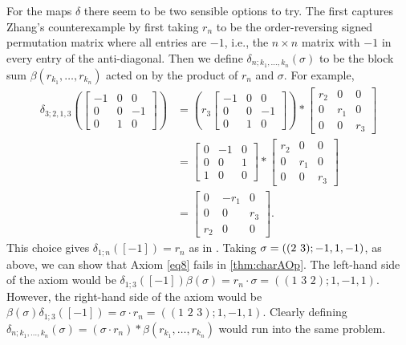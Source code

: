 \begin{nonex}
For the maps $\delta$ there seem to be two sensible options to try. The first captures Zhang's counterexample by first taking $r_n$ to be the order-reversing signed permutation matrix where all entries are $-1$, i.e., the $n \times n$ matrix with $-1$ in every entry of the anti-diagonal. Then we define $\delta_{n;k_1,\ldots,k_n}(\sigma)$ to be the block sum $\beta(r_{k_1},\ldots,r_{k_n})$ acted on by the product of $r_n$ and $\sigma$. For example,
  \begin{align*}
    \delta_{3;2,1,3}\left(
    \begin{bmatrix}
      -1 & 0 & 0 \\
      0 & 0 & -1 \\
      0 & 1 & 0
      \end{bmatrix}
      \right)
      &=
      \left(
      r_3
      \begin{bmatrix}
      -1 & 0 & 0 \\
      0 & 0 & -1 \\
      0 & 1 & 0
      \end{bmatrix}
      \right)
      \ast
      \begin{bmatrix}
      r_2 & 0 & 0 \\
      0 & r_1 & 0 \\
      0 & 0 & r_3
      \end{bmatrix}\\
&=
    \begin{bmatrix}
      0 & -1 & 0 \\
      0 & 0 & 1 \\
      1 & 0 & 0
      \end{bmatrix}
      \ast
      \begin{bmatrix}
      r_2 & 0 & 0 \\
      0 & r_1 & 0 \\
      0 & 0 & r_3
      \end{bmatrix}\\
      &= \begin{bmatrix}
      0 & -r_1 & 0\\
      0 & 0 & r_3 \\
      r_2 & 0 & 0
      \end{bmatrix}.
    \end{align*}
This choice gives $\delta_{1;n}([-1]) = r_n$ as in \cite{zhang-grp}. Taking $\sigma = (( 2 \, \, 3 );-1,1,-1)$, as above, we can show that Axiom \eqref{eq8} fails in \cref{thm:charAOp}.
The left-hand side of the axiom would be $\delta_{1;3}([-1])\beta(\sigma) = r_n \cdot \sigma = ((1 \,\, 3 \,\, 2); 1, -1, 1)$.
However, the right-hand side of the axiom would be $\beta(\sigma)\delta_{1;3}([-1]) = \sigma \cdot r_n = ((1 \,\, 2 \,\, 3);1,-1,1)$.
Clearly defining $\delta_{n;k_1,\ldots,k_n}(\sigma) = (\sigma \cdot r_n) \ast \beta(r_{k_1},\ldots,r_{k_n})$ would run into the same problem.


\end{nonex}
